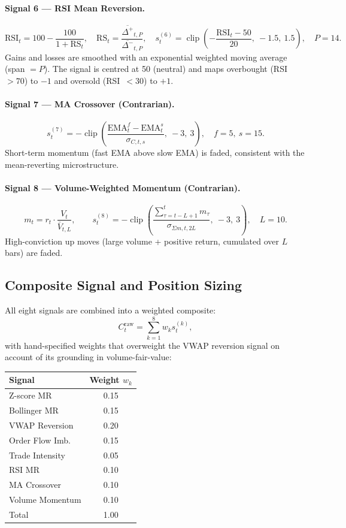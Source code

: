 \documentclass[11pt, a4paper]{article}
\begin{document}
\paragraph{Signal 6 --- RSI Mean Reversion.}
\[
\mathrm{RSI}_t = 100 - \frac{100}{1 + \mathrm{RS}_t},
\quad
\mathrm{RS}_t = \frac{\overline{\Delta^+}_{t,P}}{\overline{\Delta^-}_{t,P}},
\quad
s^{(6)}_t
  = \operatorname{clip}\!\left(-\frac{\mathrm{RSI}_t - 50}{20},\ -1.5,\ 1.5
  \right),
\quad P=14.
\]
Gains and losses are smoothed with an exponential weighted moving average (span
$= P$).  The signal is centred at 50 (neutral) and maps overbought (RSI~$>70$)
to $-1$ and oversold (RSI~$<30$) to $+1$.

\paragraph{Signal 7 --- MA Crossover (Contrarian).}
\[
s^{(7)}_t
  = -\operatorname{clip}\!\left(
     \frac{\mathrm{EMA}^{f}_t - \mathrm{EMA}^{s}_t}{\sigma_{C,t,s}},
     \ -3,\ 3
   \right),
\quad f=5,\ s=15.
\]
Short-term momentum (fast EMA above slow EMA) is faded, consistent with
the mean-reverting microstructure.

\paragraph{Signal 8 --- Volume-Weighted Momentum (Contrarian).}
\[
m_t = r_t \cdot \frac{V_t}{\bar{V}_{t,L}},
\qquad
s^{(8)}_t
  = -\operatorname{clip}\!\left(
     \frac{\sum_{\tau=t-L+1}^{t} m_\tau}{\sigma_{\Sigma m, t, 2L}},
     \ -3,\ 3
   \right),
\quad L=10.
\]
High-conviction up moves (large volume + positive return, cumulated over
$L$ bars) are faded.

\subsection{Composite Signal and Position Sizing}
\label{sec:composite}

All eight signals are combined into a weighted composite:
\[
C^{\mathrm{raw}}_t = \sum_{k=1}^{8} w_k s^{(k)}_t,
\]
with hand-specified weights that overweight the VWAP reversion signal on
account of its grounding in volume-fair-value:

\begin{center}
\begin{tabular}{lc}
\toprule
\textbf{Signal} & \textbf{Weight} $w_k$ \\
\midrule
Z-score MR        & 0.15 \\
Bollinger MR      & 0.15 \\
VWAP Reversion    & 0.20 \\
Order Flow Imb.   & 0.15 \\
Trade Intensity   & 0.05 \\
RSI MR            & 0.10 \\
MA Crossover      & 0.10 \\
Volume Momentum   & 0.10 \\
\midrule
Total             & 1.00 \\
\bottomrule
\end{tabular}
\end{center}
\end{document}
